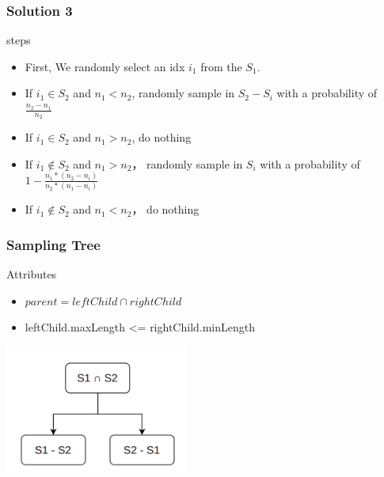 \documentclass[notheorems, aspectratio=54]{beamer}
\begin{document}
\begin{frame}
    \frametitle{Solution 3}
        \begin{block} {steps}
            \begin{itemize}
                \item First, We randomly select an idx $i_1$ from the $S_1$.
                \item If $i_1 \in S_2$ and $n_1 < n_2$, randomly sample in $S_2-S_i$ with a probability of $\frac{n_2-n_1}{n_2}$ 
                \item If $i_1 \in S_2$ and $n_1 > n_2$, do nothing
                \item If $i_1 \notin S_2$ and $n_1 > n_2$， randomly sample in $S_i$ with a probability of $1-\frac{n_1*(n_2-n_i)}{n_2*(n_1-n_i)}$
                \item If $i_1 \notin S_2$ and $n_1 < n_2$， do nothing
            \end{itemize}
        \end{block}
\end{frame}

\begin{frame}
    \frametitle{Sampling Tree}
    \begin{block} {Attributes}
        \begin{itemize}
            \item $parent = {leftChild} \cap {rightChild}$
            \item leftChild.maxLength <= rightChild.minLength
        \end{itemize}
    \end{block}
    \centering
    \includegraphics[width=6cm]{global_img_dir/SamplingTree.png}
\end{frame}
\end{document}
